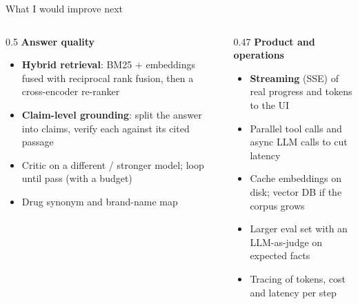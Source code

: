 \documentclass[aspectratio=169,11pt]{beamer}
\begin{document}
\begin{frame}{What I would improve next}
  \begin{columns}[T]
    \begin{column}{0.5\textwidth}
      \textbf{Answer quality}
      \begin{itemize}
        \item \textbf{Hybrid retrieval}: BM25 + embeddings fused with reciprocal rank fusion, then a cross-encoder re-ranker
        \item \textbf{Claim-level grounding}: split the answer into claims, verify each against its cited passage
        \item Critic on a different / stronger model; loop until pass (with a budget)
        \item Drug synonym and brand-name map
      \end{itemize}
    \end{column}
    \begin{column}{0.47\textwidth}
      \textbf{Product and operations}
      \begin{itemize}
        \item \textbf{Streaming} (SSE) of real progress and tokens to the UI
        \item Parallel tool calls and async LLM calls to cut latency
        \item Cache embeddings on disk; vector DB if the corpus grows
        \item Larger eval set with an LLM-as-judge on expected facts
        \item Tracing of tokens, cost and latency per step
      \end{itemize}
    \end{column}
  \end{columns}
\end{frame}
\end{document}
